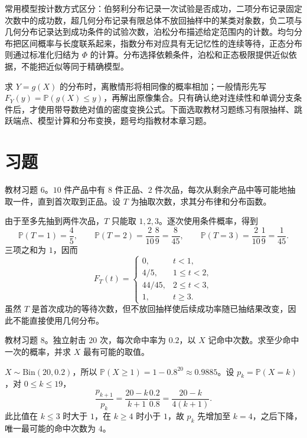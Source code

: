 常用模型按计数方式区分：伯努利分布记录一次试验是否成功，二项分布记录固定次数中的成功数，超几何分布记录有限总体不放回抽样中的某类对象数，负二项与几何分布记录达到成功条件的试验次数，泊松分布描述给定范围内的计数。均匀分布把区间概率与长度联系起来，指数分布对应具有无记忆性的连续等待，正态分布则通过标准化归结为 $\Phi$ 的计算。分布选择依赖条件，泊松和正态极限提供近似依据，不能把近似等同于精确模型。

求 $Y=g(X)$ 的分布时，离散情形将相同像的概率相加；一般情形先写 $F_Y(y)=\mathbb P(g(X)\le y)$，再解出原像集合。只有确认绝对连续性和单调分支条件后，才使用带导数绝对值的密度变换公式。下面选取教材习题练习有限抽样、跳跃端点、模型计算和分布变换，题号均指教材本章习题。

\section*{习题}

\begin{example}
\label{ex:study-ch2-exercise-6}
教材习题 6。$10$ 件产品中有 $8$ 件正品、$2$ 件次品，每次从剩余产品中等可能地抽取一件，直到首次取到正品。设 $T$ 为抽取次数，求其分布律和分布函数。
\end{example}

\begin{solve}
由于至多先抽到两件次品，$T$ 只能取 $1,2,3$。逐次使用条件概率，得到
\[
  \mathbb P(T=1)=\frac45,\qquad
  \mathbb P(T=2)=\frac2{10}\frac89=\frac8{45},\qquad
  \mathbb P(T=3)=\frac2{10}\frac19=\frac1{45}.
\]
三项之和为 $1$，因而
\[
  F_T(t)=\begin{cases}
    0,&t<1,\\
    4/5,&1\le t<2,\\
    44/45,&2\le t<3,\\
    1,&t\ge3.
  \end{cases}
\]
虽然 $T$ 是首次成功的等待次数，但不放回抽样使后续成功率随已抽结果改变，因此不能直接使用几何分布。
\end{solve}

\begin{example}
\label{ex:study-ch2-exercise-8}
教材习题 8。独立射击 $20$ 次，每次命中率为 $0.2$，以 $X$ 记命中次数。求至少命中一次的概率，并求 $X$ 最有可能的取值。
\end{example}

\begin{solve}
$X\sim\mathrm{Bin}(20,0.2)$，所以 $\mathbb P(X\ge1)=1-0.8^{20}\approx0.9885$。设 $p_k=\mathbb P(X=k)$，对 $0\le k\le19$，
\[
  \frac{p_{k+1}}{p_k}=\frac{20-k}{k+1}\frac{0.2}{0.8}
  =\frac{20-k}{4(k+1)}.
\]
此比值在 $k\le3$ 时大于 $1$，在 $k\ge4$ 时小于 $1$，故 $p_k$ 先增加至 $k=4$，之后下降，唯一最可能的命中次数为 $4$。
\end{solve}


